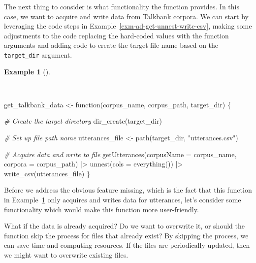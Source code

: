 \documentclass[
  letterpaper,
  DIV=11,
  numbers=noendperiod]{scrreprt}
\newenvironment{Shaded}{\begin{snugshade}}{\end{snugshade}}
\newcommand{\AttributeTok}[1]{\textcolor[rgb]{0.00,0.00,0.00}{#1}}
\newcommand{\CommentTok}[1]{\textcolor[rgb]{0.00,0.00,0.00}{\textit{#1}}}
\newcommand{\ControlFlowTok}[1]{\textcolor[rgb]{0.00,0.00,0.00}{#1}}
\newcommand{\FunctionTok}[1]{\textcolor[rgb]{0.00,0.00,0.00}{#1}}
\newcommand{\NormalTok}[1]{\textcolor[rgb]{0.00,0.00,0.00}{#1}}
\newcommand{\OtherTok}[1]{\textcolor[rgb]{0.00,0.00,0.00}{#1}}
\newcommand{\SpecialCharTok}[1]{\textcolor[rgb]{0.00,0.00,0.00}{#1}}
\newcommand{\StringTok}[1]{\textcolor[rgb]{0.00,0.00,0.00}{#1}}
\theoremstyle{definition}
\newtheorem{example}{Example}[chapter]
\theoremstyle{remark}
\begin{document}
The next thing to consider is what functionality the function provides.
In this case, we want to acquire and write data from Talkbank corpora.
We can start by leveraging the code steps in
Example~\ref{exm-ad-get-unnest-write-csv}, making some adjustments to
the code replacing the hard-coded values with the function arguments and
adding code to create the target file name based on the
\texttt{target\_dir} argument.

\begin{example}[]\protect\hypertarget{exm-ad-get-talkbank-data-2}{}\label{exm-ad-get-talkbank-data-2}

~

\begin{Shaded}
\begin{Highlighting}[]
\NormalTok{get\_talkbank\_data }\OtherTok{\textless{}{-}} \ControlFlowTok{function}\NormalTok{(corpus\_name, corpus\_path, target\_dir) \{}

  \CommentTok{\# Create the target directory}
  \FunctionTok{dir\_create}\NormalTok{(target\_dir)}

  \CommentTok{\# Set up file path name}
\NormalTok{  utterances\_file  }\OtherTok{\textless{}{-}} \FunctionTok{path}\NormalTok{(target\_dir, }\StringTok{"utterances.csv"}\NormalTok{)}

  \CommentTok{\# Acquire data and write to file}
  \FunctionTok{getUtterances}\NormalTok{(}\AttributeTok{corpusName =}\NormalTok{ corpus\_name, }\AttributeTok{corpora =}\NormalTok{ corpus\_path) }\SpecialCharTok{|\textgreater{}}
    \FunctionTok{unnest}\NormalTok{(}\AttributeTok{cols =} \FunctionTok{everything}\NormalTok{()) }\SpecialCharTok{|\textgreater{}}
    \FunctionTok{write\_csv}\NormalTok{(utterances\_file)}
\NormalTok{\}}
\end{Highlighting}
\end{Shaded}

\end{example}

Before we address the obvious feature missing, which is the fact that
this function in Example~\ref{exm-ad-get-talkbank-data-2} only acquires
and writes data for utterances, let's consider some functionality which
would make this function more user-friendly.

What if the data is already acquired? Do we want to overwrite it, or
should the function skip the process for files that already exist? By
skipping the process, we can save time and computing resources. If the
files are periodically updated, then we might want to overwrite existing
files.
\end{document}
